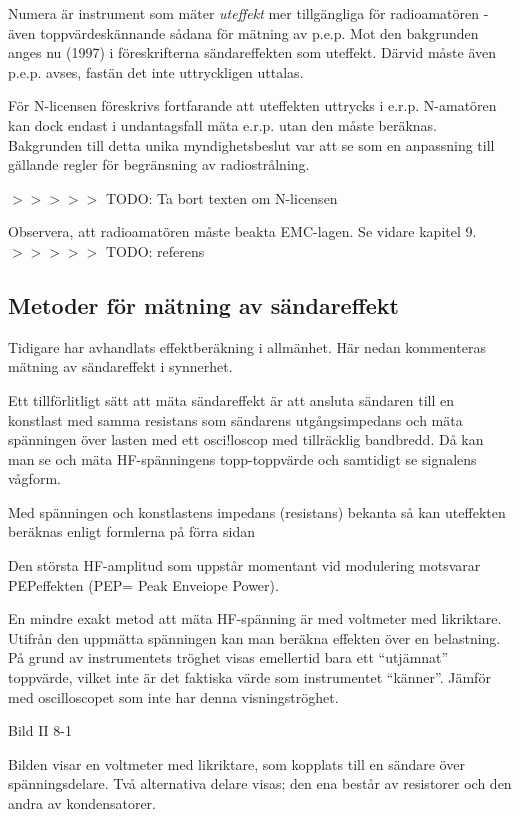 Numera är instrument som mäter \emph{uteffekt} mer tillgängliga för
radioamatören - även toppvärdeskännande sådana för mätning av
p.e.p. Mot den bakgrunden anges nu (1997) i föreskrifterna
sändareffekten som uteffekt.  Därvid måste även p.e.p. avses, fastän
det inte uttryckligen uttalas.

För N-licensen föreskrivs fortfarande att uteffekten uttrycks i
e.r.p. N-amatören kan dock endast i undantagsfall mäta e.r.p. utan den
måste beräknas. Bakgrunden till detta unika myndighetsbeslut var att
se som en anpassning till gällande regler för begränsning av
radiostrålning.

$>>>>>$ TODO: Ta bort texten om N-licensen

Observera, att radioamatören måste beakta EMC-lagen. Se vidare kapitel
9. $>>>>>$ TODO: referens

\subsection{Metoder för mätning av sändareffekt}

Tidigare har avhandlats effektberäkning i allmänhet. Här nedan
kommenteras mätning av sändareffekt i synnerhet.

Ett tillförlitligt sätt att mäta sändareffekt är att ansluta sändaren
till en konstlast med samma resistans som sändarens utgångsimpedans
och mäta spänningen över lasten med ett osci!loscop med tillräcklig
bandbredd. Då kan man se och mäta HF-spänningens topp-toppvärde och
samtidigt se signalens vågform.

Med spänningen och konstlastens impedans (resistans) bekanta så kan
uteffekten beräknas enligt formlerna på förra sidan

Den största HF-amplitud som uppstår momentant vid modulering motsvarar
PEPeffekten (PEP= Peak Enveiope Power).

En mindre exakt metod att mäta HF-spänning är med voltmeter med
likriktare.  Utifrån den uppmätta spänningen kan man beräkna effekten
över en belastning. På grund av instrumentets tröghet visas emellertid
bara ett ``utjämnat'' toppvärde, vilket inte är det faktiska värde som
instrumentet ``känner''. Jämför med oscilloscopet som inte har denna
visningströghet.

Bild II 8-1

Bilden visar en voltmeter med likriktare, som kopplats till en sändare
över spänningsdelare. Två alternativa delare visas; den ena består av
resistorer och den andra av kondensatorer.

